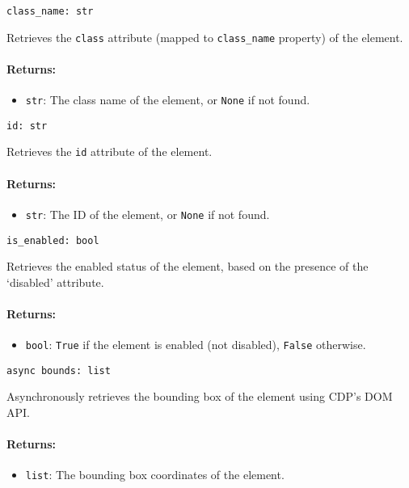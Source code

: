 \documentclass{article}
\begin{document}
\noindent\texttt{class\_name: str}

\noindent Retrieves the \texttt{class} attribute (mapped to \texttt{class\_name} property) of the element.

\paragraph{Returns:}
\begin{itemize}
    \item \texttt{str}: The class name of the element, or \texttt{None} if not found.
\end{itemize}

\noindent\texttt{id: str}

\noindent Retrieves the \texttt{id} attribute of the element.

\paragraph{Returns:}
\begin{itemize}
    \item \texttt{str}: The ID of the element, or \texttt{None} if not found.
\end{itemize}

\noindent\texttt{is\_enabled: bool}

\noindent Retrieves the enabled status of the element, based on the presence of the `disabled' attribute.

\paragraph{Returns:}
\begin{itemize}
    \item \texttt{bool}: \texttt{True} if the element is enabled (not disabled), \texttt{False} otherwise.
\end{itemize}

\noindent\texttt{async bounds: list}

\noindent Asynchronously retrieves the bounding box of the element using CDP's DOM API.

\paragraph{Returns:}
\begin{itemize}
    \item \texttt{list}: The bounding box coordinates of the element.
\end{itemize}
\end{document}
